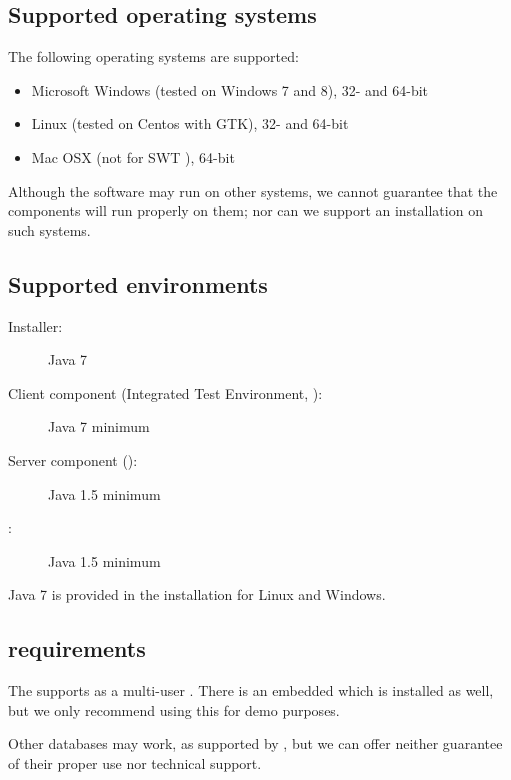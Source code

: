 
\subsection{Supported operating systems}
The following operating systems are supported:
\begin{itemize}
  \item Microsoft Windows (tested on Windows 7 and 8), 32- and 64-bit
  \item  Linux (tested on Centos with GTK), 32- and 64-bit
  \item Mac OSX (not for SWT \gdauts{}), 64-bit 

\end{itemize}

Although the software may run on other systems, we cannot guarantee that the components will run properly on them; nor can we support an installation on such systems.

\subsection{Supported  environments}
\begin{description}
\item [Installer:]{Java 7}
\item [Client component (Integrated Test Environment, \ite{}):]{Java 7 minimum}
\item [Server component (\gdagent):]{Java 1.5 minimum}
\item [\gdaut{}:]{Java 1.5 minimum}
\end{description}
Java 7 is provided in the  installation for Linux and Windows.

 

\subsection{\gdDB requirements}
The \ite{} supports   as a multi-user \gddb{}. There is an embedded \gddb{} which is installed as well, but we only recommend using this for demo purposes. 

Other databases may work, as supported by , but we can offer neither guarantee of their proper use nor technical support. 


